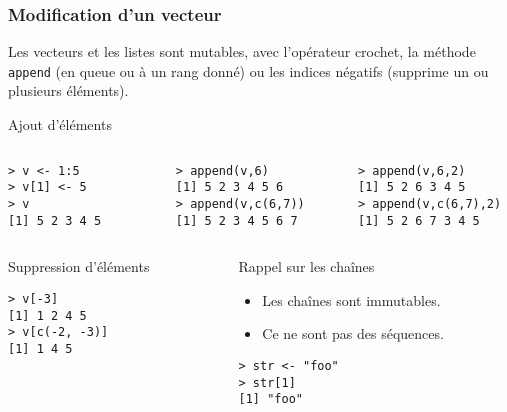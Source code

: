\documentclass[10pt]{beamer}
\begin{document}
\begin{frame}[fragile]
  \frametitle{Modification d'un vecteur}
  Les vecteurs et les listes sont mutables, avec l'opérateur crochet, la méthode \texttt{append} (en queue ou à un rang donné) ou les indices négatifs (supprime un ou plusieurs éléments).
  \begin{exampleblock}{Ajout d'éléments}
\begin{columns}[t]
\begin{column}{0.33\textwidth}
  \begin{lstlisting}
> v <- 1:5
> v[1] <- 5
> v
[1] 5 2 3 4 5      
\end{lstlisting}
\end{column}
\begin{column}{0.33\textwidth}
  \begin{lstlisting}
> append(v,6)
[1] 5 2 3 4 5 6
> append(v,c(6,7))
[1] 5 2 3 4 5 6 7    
  \end{lstlisting}
\end{column}
\begin{column}{0.34\textwidth}
  \begin{lstlisting}
> append(v,6,2) 
[1] 5 2 6 3 4 5
> append(v,c(6,7),2)
[1] 5 2 6 7 3 4 5  
\end{lstlisting}
\end{column}

\end{columns}
\end{exampleblock}


\begin{columns}[t]
\begin{column}{0.43\textwidth}
\begin{exampleblock}{Suppression d'éléments}
  \begin{lstlisting}[style=block]
> v[-3]
[1] 1 2 4 5
> v[c(-2, -3)]
[1] 1 4 5
\end{lstlisting}  
\end{exampleblock}
\end{column}
\begin{column}{0.53\textwidth}
  \begin{block}{Rappel sur les chaînes}
    \begin{itemize}
    \item Les chaînes sont immutables.
    \item Ce ne sont pas des séquences.
    \end{itemize}

  \begin{lstlisting}
> str <- "foo"
> str[1]
[1] "foo"
\end{lstlisting}
\end{block}
\end{column}
\end{columns}
\end{frame}
\end{document}

